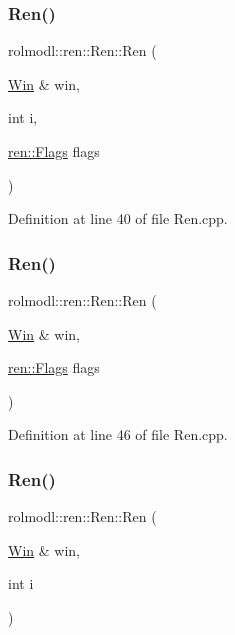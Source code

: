 \subsubsection{\texorpdfstring{Ren()}{Ren()}\hspace{0.1cm}{\footnotesize\ttfamily [1/6]}}
{\footnotesize\ttfamily rolmodl\+::ren\+::\+Ren\+::\+Ren (\begin{DoxyParamCaption}\item[{\mbox{\hyperlink{classrolmodl_1_1_win}{Win}} \&}]{win,  }\item[{int}]{i,  }\item[{\mbox{\hyperlink{structrolmodl_1_1blend_mode_1_1ren_1_1_flags}{ren\+::\+Flags}}}]{flags }\end{DoxyParamCaption})}



Definition at line 40 of file Ren.\+cpp.

\mbox{\label{classrolmodl_1_1blend_mode_1_1_ren_a26c089075ecf3b7f807167082fa2f6f3}} 
\subsubsection{\texorpdfstring{Ren()}{Ren()}\hspace{0.1cm}{\footnotesize\ttfamily [2/6]}}
{\footnotesize\ttfamily rolmodl\+::ren\+::\+Ren\+::\+Ren (\begin{DoxyParamCaption}\item[{\mbox{\hyperlink{classrolmodl_1_1_win}{Win}} \&}]{win,  }\item[{\mbox{\hyperlink{structrolmodl_1_1blend_mode_1_1ren_1_1_flags}{ren\+::\+Flags}}}]{flags }\end{DoxyParamCaption})}



Definition at line 46 of file Ren.\+cpp.

\mbox{\label{classrolmodl_1_1blend_mode_1_1_ren_a9ba2bef30d795f156799c60b51d9190b}} 
\subsubsection{\texorpdfstring{Ren()}{Ren()}\hspace{0.1cm}{\footnotesize\ttfamily [3/6]}}
{\footnotesize\ttfamily rolmodl\+::ren\+::\+Ren\+::\+Ren (\begin{DoxyParamCaption}\item[{\mbox{\hyperlink{classrolmodl_1_1_win}{Win}} \&}]{win,  }\item[{int}]{i }\end{DoxyParamCaption})}



